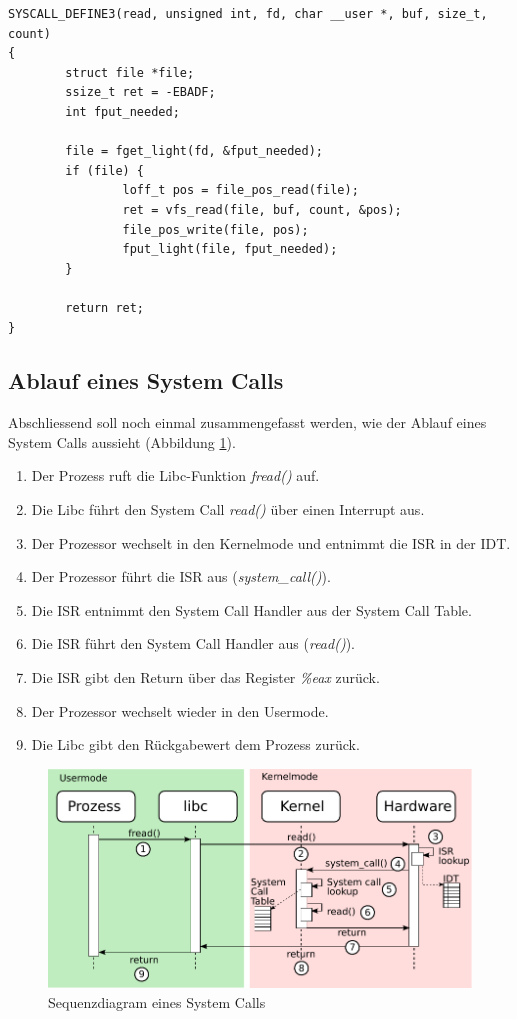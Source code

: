 \begin{lstlisting}[label=sys_read,caption=fs/read\_write.c]
SYSCALL_DEFINE3(read, unsigned int, fd, char __user *, buf, size_t, count)
{
        struct file *file;
        ssize_t ret = -EBADF;
        int fput_needed;

        file = fget_light(fd, &fput_needed);
        if (file) {
                loff_t pos = file_pos_read(file);
                ret = vfs_read(file, buf, count, &pos);
                file_pos_write(file, pos);
                fput_light(file, fput_needed);
        }

        return ret;
}
\end{lstlisting}

\subsection{Ablauf eines System Calls}

Abschliessend soll noch einmal zusammengefasst werden, wie der Ablauf eines System Calls aussieht (Abbildung \ref{syscall_flow}).

\begin{enumerate}
   \item Der Prozess ruft die Libc-Funktion \emph{fread()} auf.
   \item Die Libc führt den System Call \emph{read()} über einen Interrupt aus.
   \item Der Prozessor wechselt in den Kernelmode und entnimmt die ISR in der IDT.
   \item Der Prozessor führt die ISR aus (\emph{system\_call()}).
   \item Die ISR entnimmt den System Call Handler aus der System Call Table.
   \item Die ISR führt den System Call Handler aus (\emph{read()}).
   \item Die ISR gibt den Return über das Register \emph{\%eax} zurück.
   \item Der Prozessor wechselt wieder in den Usermode.
   \item Die Libc gibt den Rückgabewert dem Prozess zurück.
\end{enumerate}

\begin{figure}[h!]
   \begin{center}
      \includegraphics{images/syscall_flow}
   \end{center}
   \caption{Sequenzdiagram eines System Calls}
   \label{syscall_flow}
\end{figure}
\clearpage
